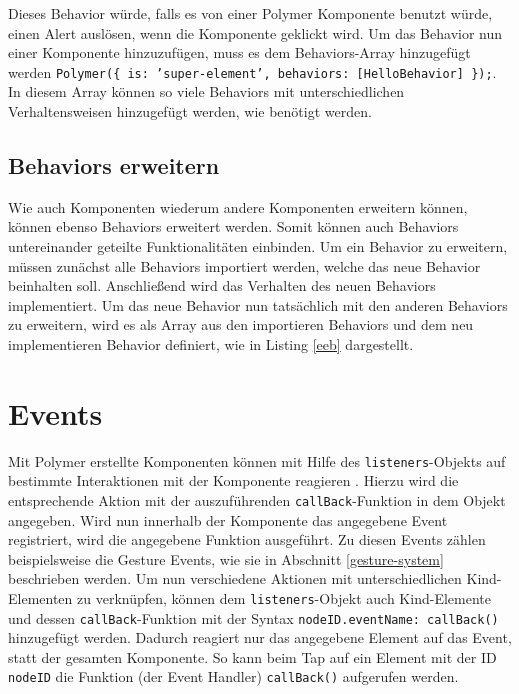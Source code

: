 

Dieses Behavior würde, falls es von einer Polymer Komponente benutzt würde, einen Alert auslösen, wenn die Komponente geklickt wird. Um das Behavior nun einer Komponente hinzuzufügen, muss es dem Behaviors-Array hinzugefügt werden \texttt{Polymer(\{\ is:\ 'super-element',\ behaviors:\ {[}HelloBehavior{]}\ \});}. In diesem Array können so viele Behaviors mit unterschiedlichen Verhaltensweisen hinzugefügt werden, wie be\-nö\-tigt werden.


\subsection{Behaviors erweitern}\label{behaviors-erweitern}

Wie auch Komponenten wiederum andere Komponenten erweitern können, können ebenso Behaviors erweitert werden. Somit können auch Behaviors untereinander geteilte Funktionalitäten einbinden. Um ein Behavior zu erweitern, müssen zunächst alle Behaviors importiert werden, welche das neue Behavior beinhalten soll. Anschließend wird das Verhalten des neuen Behaviors implementiert. Um das neue Behavior nun tatsächlich mit den anderen Behaviors zu erweitern, wird es als Array aus den importieren Behaviors und dem neu implementieren Behavior definiert, wie in Listing \ref{eeb} dargestellt.




\section{Events}\label{events}

Mit Polymer erstellte Komponenten können mit Hilfe des \texttt{listeners}-Objekts auf bestimmte Interaktionen mit der Komponente reagieren \cite{citeulike:13915080}. Hierzu wird die entsprechende Aktion mit der auszuführenden \texttt{callBack}-Funktion in dem Objekt angegeben. Wird nun innerhalb der Komponente das angegebene Event registriert, wird die angegebene Funktion ausgeführt. Zu diesen Events zählen beispielsweise die Gesture Events, wie sie in Abschnitt \ref{gesture-system} beschrieben werden. Um nun verschiedene Aktionen mit unterschiedlichen Kind-Elementen zu verknüpfen, können dem \texttt{listeners}-Objekt auch Kind-Elemente und dessen \texttt{callBack}-Funktion mit der Syntax \texttt{nodeID.eventName:\ callBack()} hinzugefügt werden. Dadurch reagiert nur das angegebene Element auf das Event, statt der gesamten Komponente. So kann beim Tap auf ein Element mit der ID \texttt{nodeID} die Funktion (der Event Handler) \texttt{callBack()} aufgerufen werden.


